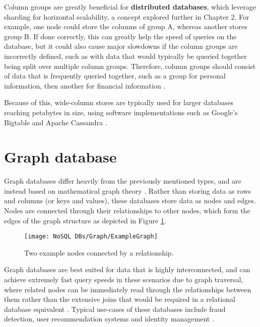 \noindent Column groups are greatly beneficial for \textbf{distributed databases}, which leverage sharding for horizontal scalability, a concept
explored further in Chapter 2.
For example, one node could store the columns of group A, whereas another stores group B. If done correctly, this can greatly help the speed
of queries on the database, but it could also cause major slowdowns if the column groups are incorrectly defined, such as with data that would
typically be queried together being split over multiple column groups. Therefore, column groups should consist of data that is frequently 
queried together, such as a group for personal information, then another for financial information \autocite{cattellScalableSQLNoSQL2011}. 


\para Because of this, wide-column stores are typically used for larger databases reaching petabytes in size, using software implementations such
as Google's Bigtable \autocite{changBigtableDistributedStorage2008} and Apache Cassandra \autocite{apacheApacheCassandraApache}.


\pagebreak

\section{Graph database}
Graph databases differ heavily from the previously mentioned types, and are instead based on mathematical graph theory \autocite{awsWhatGraphDatabase}.
Rather than storing data as rows and columns (or keys and values), these 
databases store data as nodes and edges. Nodes are connected through their relationships to other nodes, which form the edges of the graph 
structure as depicted in Figure \ref{fig:ExampleGraph}.

\begin{figure}[H]
    \centering
    \texttt{[image: NoSQL DBs/Graph/ExampleGraph]}
    \caption{Two example nodes connected by a relationship. \autocite{neo4jWhatGraphDatabase}\label{fig:ExampleGraph}}
\end{figure}

\noindent Graph databases are best suited for data that is highly interconnected, and can achieve extremely fast query speeds in these scenarios
due to graph traversal, where related nodes can be immediately read through the relationships between them rather than the extensive joins
that would be required in a relational database equivalent \autocite{corbelliniPersistingBigdataNoSQL2017}. Typical use-cases of these 
databases include fraud detection, user recommendation systems and identity management \autocite{neo4jGraphDatabaseUse,awsManagedGraphDatabase,memgraphGraphDatabaseVs}.

